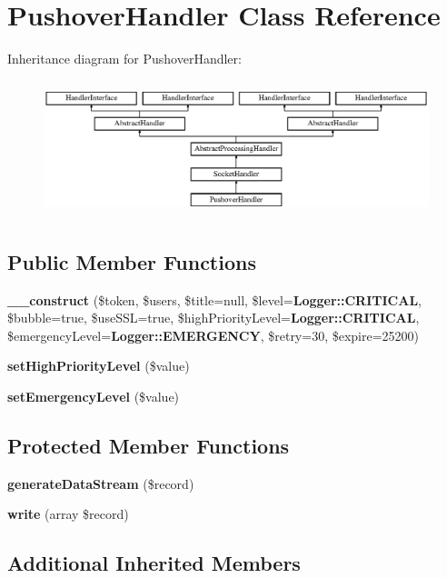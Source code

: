 \section{Pushover\+Handler Class Reference}
\label{class_monolog_1_1_handler_1_1_pushover_handler}
Inheritance diagram for Pushover\+Handler\+:\begin{figure}[H]
\begin{center}
\leavevmode
\includegraphics[height=4.000000cm]{class_monolog_1_1_handler_1_1_pushover_handler}
\end{center}
\end{figure}
\subsection*{Public Member Functions}
\begin{DoxyCompactItemize}
\item 
{\bf \+\_\+\+\_\+construct} (\$token, \$users, \$title=null, \$level={\bf Logger\+::\+C\+R\+I\+T\+I\+C\+A\+L}, \$bubble=true, \$use\+S\+S\+L=true, \$high\+Priority\+Level={\bf Logger\+::\+C\+R\+I\+T\+I\+C\+A\+L}, \$emergency\+Level={\bf Logger\+::\+E\+M\+E\+R\+G\+E\+N\+C\+Y}, \$retry=30, \$expire=25200)
\item 
{\bf set\+High\+Priority\+Level} (\$value)
\item 
{\bf set\+Emergency\+Level} (\$value)
\end{DoxyCompactItemize}
\subsection*{Protected Member Functions}
\begin{DoxyCompactItemize}
\item 
{\bf generate\+Data\+Stream} (\$record)
\item 
{\bf write} (array \$record)
\end{DoxyCompactItemize}
\subsection*{Additional Inherited Members}


